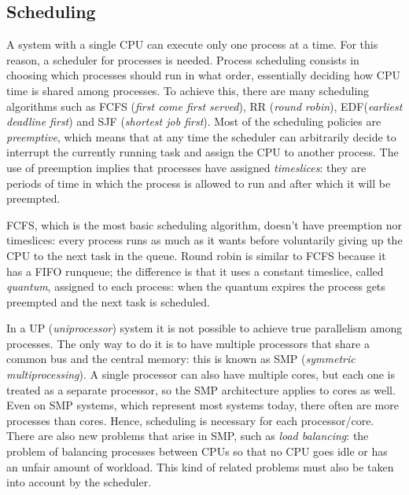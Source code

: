 \subsection{Scheduling} 
\label{sec:scheduling}
A system with a single CPU can execute only one process at a time. For this reason, a scheduler for processes is needed. Process scheduling consists in choosing which processes should run in what order, essentially deciding how CPU time is shared among processes. To achieve this, there are many scheduling algorithms such as FCFS (\textit{first come first served}), RR (\textit{round robin}), EDF(\textit{earliest deadline first}) and SJF (\textit{shortest job first}). Most of the scheduling policies are \textit{preemptive}, which means that at any time the scheduler can arbitrarily decide to interrupt the currently running task and assign the CPU to another process. The use of preemption implies that processes have assigned \textit{timeslices}: they are periods of time in which the process is allowed to run and after which it will be preempted. 

FCFS, which is the most basic scheduling algorithm, doesn't have preemption nor timeslices: every process runs as much as it wants before voluntarily giving up the CPU to the next task in the queue. Round robin is similar to FCFS because it has a FIFO runqueue; the difference is that it uses a constant timeslice, called \textit{quantum}, assigned to each process: when the quantum expires the process gets preempted and the next task is scheduled.

In a UP (\textit{uniprocessor}) system it is not possible to achieve true parallelism among processes. The only way to do it is to have multiple processors that share a common bus and the central memory: this is known as SMP (\textit{symmetric multiprocessing}). A single processor can also have multiple cores, but each one is treated as a separate processor, so the SMP architecture applies to cores as well. Even on SMP systems, which represent most systems today, there often are more processes than cores. Hence, scheduling is necessary for each processor/core. There are also new problems that arise in SMP, such as \textit{load balancing}: the problem of balancing processes between CPUs so that no CPU goes idle or has an unfair amount of workload. This kind of related problems must also be taken into account by the scheduler.

